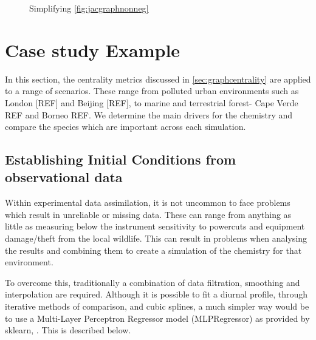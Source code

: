 \begin{figure}[H]
\begin{center}

\end{center}

\caption{ Simplifying \autoref{fig:jacgraphnonneg}}
\label{fig:jacgraphsim}
\end{figure}


\section{Case study Example}\label{sec:metriccase}
In this section, the centrality metrics discussed in \autoref{sec:graphcentrality} are applied to a range of scenarios. These range from polluted urban environments such as London [REF] and Beijing [REF], to marine and terrestrial forest- Cape Verde REF and Borneo REF. We determine the main drivers for the chemistry and compare the species which are important across each simulation.  

\subsection{Establishing Initial Conditions from observational data}
Within experimental data assimilation, it is not uncommon to face problems which result in unreliable or missing data. These can range from anything as little as measuring below the instrument sensitivity to powercuts and equipment damage/theft from the local wildlife. This can result in problems when analysing the results and combining them to create a simulation of the chemistry for that environment. 

To overcome this, traditionally a combination of data filtration, smoothing and interpolation are required. Although it is possible to fit a diurnal profile, through iterative methods of comparison, and cubic splines, a much simpler way would be to use a Multi-Layer Perceptron Regressor model (MLPRegressor) as provided by sklearn, \citep{sklearn}. This is described below.

